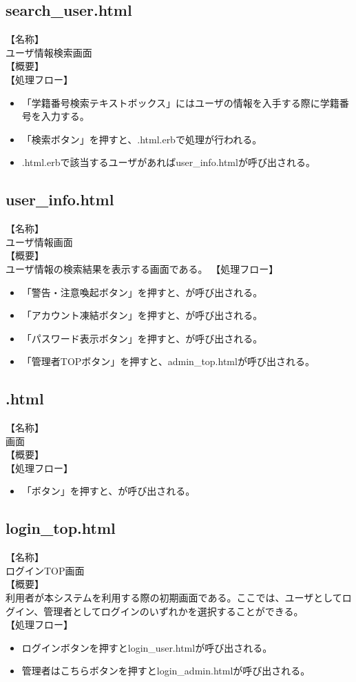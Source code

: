 \documentclass[a4j]{jarticle}
\begin{document}
\subsection{search\_user.html}
\noindent
【名称】\\
ユーザ情報検索画面\\
【概要】\\
【処理フロー】
\begin{itemize}
\item 「学籍番号検索テキストボックス」にはユーザの情報を入手する際に学籍番号を入力する。
\item 「検索ボタン」を押すと、.html.erbで処理が行われる。
\item .html.erbで該当するユーザがあればuser\_info.htmlが呼び出される。
\end{itemize}

\subsection{user\_info.html}
\noindent
【名称】\\
ユーザ情報画面\\
【概要】\\
ユーザ情報の検索結果を表示する画面である。
【処理フロー】
\begin{itemize}
\item 「警告・注意喚起ボタン」を押すと、が呼び出される。
\item 「アカウント凍結ボタン」を押すと、が呼び出される。
\item 「パスワード表示ボタン」を押すと、が呼び出される。
\item 「管理者TOPボタン」を押すと、admin\_top.htmlが呼び出される。
\end{itemize}

\subsection{.html}
\noindent
【名称】\\
画面\\
【概要】\\
【処理フロー】
\begin{itemize}
\item 「ボタン」を押すと、が呼び出される。
\end{itemize}

\subsection{login\_top.html}
【名称】\\
ログインTOP画面\\
【概要】\\
利用者が本システムを利用する際の初期画面である。ここでは、ユーザとしてログイン、管理者としてログインのいずれかを選択することができる。\\
【処理フロー】
\begin{itemize}
  \item ログインボタンを押すとlogin\_user.htmlが呼び出される。
  \item 管理者はこちらボタンを押すとlogin\_admin.htmlが呼び出される。
\end{itemize}
\end{document}
